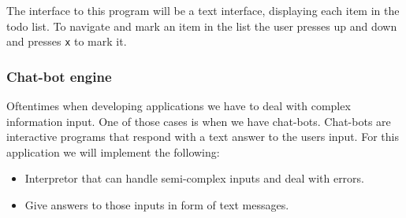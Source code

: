 The interface to this program will be a text interface, displaying each item in
the todo list. To navigate and mark an item in the list the user presses up and
down and presses \texttt{x} to mark it.

\subsubsection*{Chat-bot engine}

Oftentimes when developing applications we have to deal with complex information
input. One of those cases is when we have chat-bots. Chat-bots are interactive
programs that respond with a text answer to the users input. For this
application we will implement the following:

\begin{itemize}
    \item Interpretor that can handle semi-complex inputs and deal with errors.
    \item Give answers to those inputs in form of text messages.
\end{itemize}

